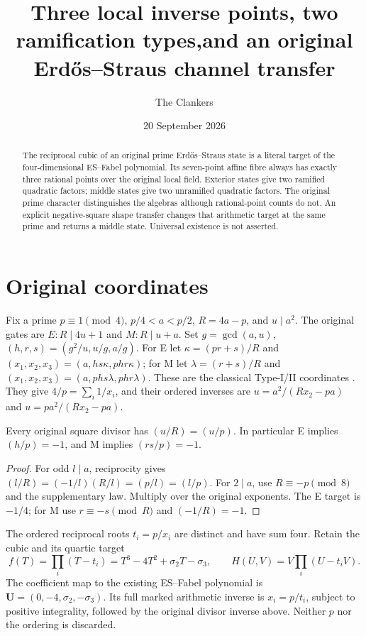 \documentclass[11pt,reqno]{amsart}
\title[Prime-local Fabel fibres and channel transfer]{Three local inverse points, two ramification types,\newline and an original Erd\H{o}s--Straus channel transfer}
\author{The Clankers}\date{20 September 2026}
\begin{document}
\begin{abstract}
The reciprocal cubic of an original prime Erd\H{o}s--Straus state is a literal
target of the four-dimensional ES--Fabel polynomial. Its seven-point affine
fibre always has exactly three rational points over the original local field.
Exterior states give two ramified quadratic factors; middle states give two
unramified quadratic factors. The original prime character distinguishes the
algebras although rational-point counts do not. An explicit negative-square
shape transfer changes that arithmetic target at the same prime and returns a
middle state. Universal existence is not asserted.
\end{abstract}
\maketitle

\section{Original coordinates}
Fix a prime $p\equiv1\pmod4$, $p/4<a<p/2$, $R=4a-p$, and $u\mid a^2$.
The original gates are $E:R\mid4u+1$ and $M:R\mid u+a$.
Set $g=\gcd(a,u)$, $(h,r,s)=(g^2/u,u/g,a/g)$. For E let
$\kappa=(pr+s)/R$ and $(x_1,x_2,x_3)=(a,hs\kappa,phr\kappa)$;
for M let $\lambda=(r+s)/R$ and $(x_1,x_2,x_3)=(a,phs\lambda,phr\lambda)$.
These are the classical Type-I/II coordinates \cite[\S2]{ET}.
They give $4/p=\sum_i1/x_i$, and their ordered inverses are
$u=a^2/(Rx_2-pa)$ and $u=pa^2/(Rx_2-pa)$.

\begin{lemma}
Every original square divisor has $(u/R)=(u/p)$. In particular E implies
$(h/p)=-1$, and M implies $(rs/p)=-1$.
\end{lemma}
\begin{proof}
For odd $l\mid a$, reciprocity gives $(l/R)=(-1/l)(R/l)=(p/l)=(l/p)$.
For $2\mid a$, use $R\equiv-p\pmod8$ and the supplementary law. Multiply over
the original exponents. The E target is $-1/4$; for M use
$r\equiv-s\pmod R$ and $(-1/R)=-1$.
\end{proof}

The ordered reciprocal roots $t_i=p/x_i$ are distinct and have sum four.
Retain the cubic and its quartic target
\[
 f(T)=\prod_i(T-t_i)=T^3-4T^2+\sigma_2T-\sigma_3,
 \qquad H(U,V)=V\prod_i(U-t_iV).
\]
The coefficient map to the existing ES--Fabel polynomial is
$\mathbf U=(0,-4,\sigma_2,-\sigma_3)$. Its full marked arithmetic inverse is
$x_i=p/t_i$, subject to positive integrality, followed by the original divisor
inverse above. Neither $p$ nor the ordering is discarded.
\end{document}
